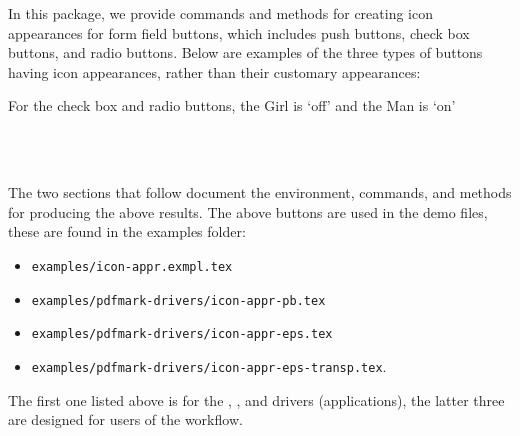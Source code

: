\documentclass{article}
\begin{document}
In this package, we provide commands and methods for creating icon
appearances for form field buttons, which includes push buttons, check box
buttons, and radio buttons. Below are examples of the three types of buttons
having icon appearances, rather than their customary appearances:
\begin{flushleft}
\hskip15pt
\qquad
%
\qquad %
%
\quad
{}\quad
{}\qquad %
%
\hfill
\parbox{1.5in}{\footnotesize For the check box and radio buttons, the Girl is `off'
and the Man is `on'}%
\\[3pt]
\bgroup{}\relax\footnotesize
{}\qquad
{}\qquad
{}\\[3pt]
\makebox[52bp][c]{\hfill}\qquad
\egroup
\end{flushleft}
The two sections that follow document the environment, commands, and methods for producing the
above results. The above buttons are used in the demo files, these are found in the
\textsf{examples} folder:
\begin{itemize}
\item \texttt{examples/icon-appr.exmpl.tex}
\item \texttt{examples/pdfmark-drivers/icon-appr-pb.tex}
\item \texttt{examples/pdfmark-drivers/icon-appr-eps.tex}
\item \texttt{examples/pdfmark-drivers/icon-appr-eps-transp.tex}.
\end{itemize}
The first one listed above is for the , , and
 drivers (applications), the latter three are designed for users
of the  workflow.
\end{document}
